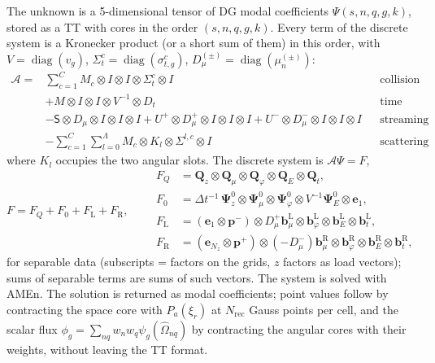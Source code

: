 \documentclass[11pt,a4paper]{article}
\newcommand{\Om}{\hat{\Omega}}
\newcommand{\kron}{\otimes}
\newcommand{\Lmax}{\Lambda}
\newcommand{\pp}{{\bm{p}^{+}}}
\newcommand{\pmn}{{\bm{p}^{-}}}
\newcommand{\diag}{\operatorname{diag}}
\begin{document}
The unknown is a 5-dimensional tensor of DG modal coefficients $\Psi(s,n,q,g,k)$, stored as a TT with cores in the order $(s,n,q,g,k)$. Every term of the discrete system is a Kronecker product (or a short sum of them) in this order, with $V=\diag(v_g)$, $\Sigma^c_t=\diag(\sigma^c_{t,g})$, $D_\mu^{(\pm)}=\diag(\mu_n^{(\pm)})$:
\begin{equation}
\boxed{
\begin{aligned}
\mathcal A={}&\sum_{c=1}^{C}M_c\kron I\kron I\kron\Sigma^c_t\kron I &&\text{collision}\\
&+M\kron I\kron I\kron V^{-1}\kron D_t &&\text{time derivative}\\
&-\mathsf S\kron D_\mu\kron I\kron I\kron I+U^+\kron D_\mu^+\kron I\kron I\kron I+U^-\kron D_\mu^-\kron I\kron I\kron I &&\text{streaming}\\
&-\sum_{c=1}^{C}\sum_{l=0}^{\Lmax}M_c\kron K_l\kron\Sigma^{l,c}\kron I &&\text{scattering}
\end{aligned}}
\label{eq:A}
\end{equation}
where $K_l$ occupies the two angular slots. The discrete system is $\mathcal A\Psi=F$,
\begin{equation}
F=F_Q+F_0+F_{\mathrm L}+F_{\mathrm R},\qquad
\begin{aligned}
F_Q&=\bm Q_z\kron\bm Q_\mu\kron\bm Q_\varphi\kron\bm Q_E\kron\bm Q_t,\\
F_0&=\Delta t^{-1}\,\bm\Psi^0_z\kron\bm\Psi^0_\mu\kron\bm\Psi^0_\varphi\kron V^{-1}\bm\Psi^0_E\kron\bm e_1,\\
F_{\mathrm L}&=(\bm e_1\kron\pmn)\kron D^+_\mu\bm b^{\mathrm L}_\mu\kron\bm b^{\mathrm L}_\varphi\kron\bm b^{\mathrm L}_E\kron\bm b^{\mathrm L}_t,\\
F_{\mathrm R}&=(\bm e_{N_z}\kron\pp)\kron(-D^-_\mu)\bm b^{\mathrm R}_\mu\kron\bm b^{\mathrm R}_\varphi\kron\bm b^{\mathrm R}_E\kron\bm b^{\mathrm R}_t,
\end{aligned}
\label{eq:F}
\end{equation}
for separable data (subscripts = factors on the grids, $z$ factors as load vectors); sums of separable terms are sums of such vectors. The system is solved with AMEn. The solution is returned as modal coefficients; point values follow by contracting the space core with $P_a(\xi_r)$ at $N_{\mathrm{rec}}$ Gauss points per cell, and the scalar flux $\phi_g=\sum_{nq}w_nw_q\psi_g(\Om_{nq})$ by contracting the angular cores with their weights, without leaving the TT format.
\end{document}
